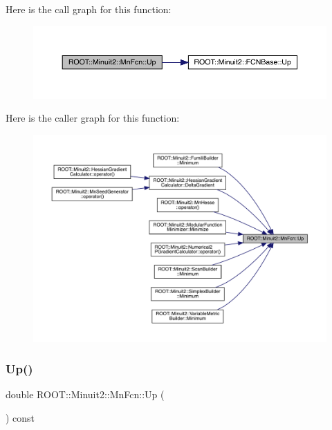 Here is the call graph for this function\+:\nopagebreak
\begin{figure}[H]
\begin{center}
\leavevmode
\includegraphics[width=350pt]{de/d0e/classROOT_1_1Minuit2_1_1MnFcn_a2c91d0dd77e9c913116fb84b6fe31633_cgraph}
\end{center}
\end{figure}
Here is the caller graph for this function\+:\nopagebreak
\begin{figure}[H]
\begin{center}
\leavevmode
\includegraphics[width=350pt]{de/d0e/classROOT_1_1Minuit2_1_1MnFcn_a2c91d0dd77e9c913116fb84b6fe31633_icgraph}
\end{center}
\end{figure}
\mbox{\label{classROOT_1_1Minuit2_1_1MnFcn_a2c91d0dd77e9c913116fb84b6fe31633}} 
\subsubsection{\texorpdfstring{Up()}{Up()}\hspace{0.1cm}{\footnotesize\ttfamily [2/2]}}
{\footnotesize\ttfamily double R\+O\+O\+T\+::\+Minuit2\+::\+Mn\+Fcn\+::\+Up (\begin{DoxyParamCaption}{ }\end{DoxyParamCaption}) const}



